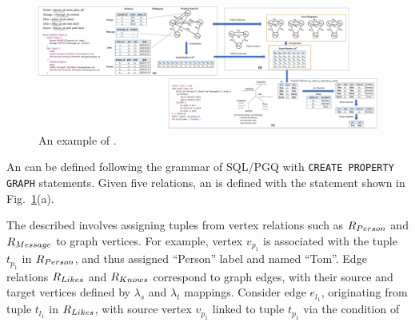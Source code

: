\begin{figure}
    \centering
    \includegraphics[width=\linewidth]{./figures/rgmapping.pdf}
    \caption{An example of \rgmapping.}
    \label{fig:intro-rgmapping-example}
\end{figure}

\begin{example}
    \label{ex:rgmapping}
    An \rgmapping can be defined following the grammar of SQL/PGQ with \lstinline{CREATE PROPERTY GRAPH} statements.
    Given five relations, an \rgmapping is defined with the statement shown in Fig.~\ref{fig:intro-rgmapping-example}(a).

    The described \rgmapping involves assigning tuples from vertex relations such as ${R_{Person}}$ and ${R_{Message}}$ to graph vertices. For example, vertex $v_{p_1}$ is associated with the tuple $t_{p_1}$ in ${R_{Person}}$, and thus assigned ``Person'' label and named ``Tom''. Edge relations ${R_{Likes}}$ and ${R_{Knows}}$ correspond to graph edges, with their source and target vertices defined by $\lambda_s$ and $\lambda_t$ mappings. Consider edge $e_{l_1}$, originating from tuple $t_{l_1}$ in ${R_{Likes}}$, with source vertex $v_{p_1}$ linked to tuple $t_{p_1}$ via the condition of

\end{example}
